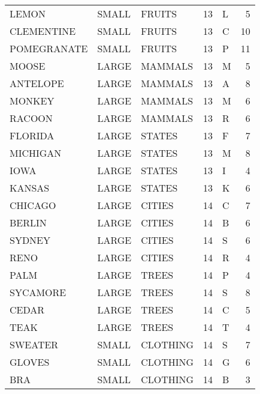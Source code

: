 \begin{tabular}{lllrlr}
       LEMON & SMALL &           FRUITS &       13 &            L &       5 \\
  CLEMENTINE & SMALL &           FRUITS &       13 &            C &      10 \\
 POMEGRANATE & SMALL &           FRUITS &       13 &            P &      11 \\
       MOOSE & LARGE &          MAMMALS &       13 &            M &       5 \\
    ANTELOPE & LARGE &          MAMMALS &       13 &            A &       8 \\
      MONKEY & LARGE &          MAMMALS &       13 &            M &       6 \\
      RACOON & LARGE &          MAMMALS &       13 &            R &       6 \\
     FLORIDA & LARGE &           STATES &       13 &            F &       7 \\
    MICHIGAN & LARGE &           STATES &       13 &            M &       8 \\
        IOWA & LARGE &           STATES &       13 &            I &       4 \\
      KANSAS & LARGE &           STATES &       13 &            K &       6 \\
     CHICAGO & LARGE &           CITIES &       14 &            C &       7 \\
      BERLIN & LARGE &           CITIES &       14 &            B &       6 \\
      SYDNEY & LARGE &           CITIES &       14 &            S &       6 \\
        RENO & LARGE &           CITIES &       14 &            R &       4 \\
        PALM & LARGE &            TREES &       14 &            P &       4 \\
    SYCAMORE & LARGE &            TREES &       14 &            S &       8 \\
       CEDAR & LARGE &            TREES &       14 &            C &       5 \\
        TEAK & LARGE &            TREES &       14 &            T &       4 \\
     SWEATER & SMALL &         CLOTHING &       14 &            S &       7 \\
      GLOVES & SMALL &         CLOTHING &       14 &            G &       6 \\
         BRA & SMALL &         CLOTHING &       14 &            B &       3 \\

\end{tabular}
